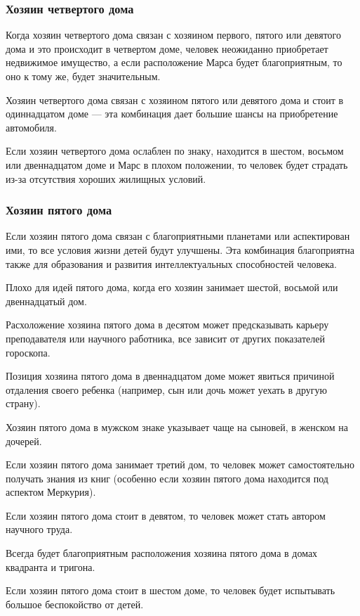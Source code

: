 \subsubsection*{Хозяин четвертого дома}

Когда хозяин четвертого дома связан с хозяином первого, пятого или девятого дома и это происходит в четвертом доме, человек неожиданно приобретает недвижимое имущество, а если расположение Марса будет благоприятным, то оно к тому же, будет значительным.

Хозяин четвертого дома связан с хозяином пятого или девятого дома и стоит в одиннадцатом доме --- эта комбинация дает большие шансы на приобретение автомобиля.

Если хозяин четвертого дома ослаблен по знаку, находится в шестом, восьмом или двеннадцатом доме и Марс в плохом положении, то человек будет страдать из-за отсутствия хороших жилищных условий.

\subsubsection*{Хозяин пятого дома}
Если хозяин пятого дома связан с благоприятными планетами или аспектирован ими, то все условия жизни детей будут улучшены. Эта комбинация благоприятна также для образования и развития интеллектуальных способностей человека.

Плохо для идей пятого дома, когда его хозяин занимает шестой, восьмой или двеннадцатый дом.

Расхоложение хозяина пятого дома в десятом может предсказывать карьеру преподавателя или научного работника, все зависит от других показателей гороскопа.

Позиция хозяина пятого дома в двеннадцатом доме может явиться причиной отдаления своего ребенка (например, сын или дочь может уехать в другую страну).

Хозяин пятого дома в мужском знаке указывает чаще на сыновей, в женском на дочерей.

Если хозяин пятого дома занимает третий дом, то человек может самостоятельно получать знания из книг (особенно если хозяин пятого дома находится под аспектом Меркурия).

Если хозяин пятого дома стоит в девятом, то человек может стать автором научного труда.

Всегда будет благоприятным расположения хозяина пятого дома в домах квадранта и тригона.

Если хозяин пятого дома стоит в шестом доме, то человек будет испытывать большое беспокойство от детей.

